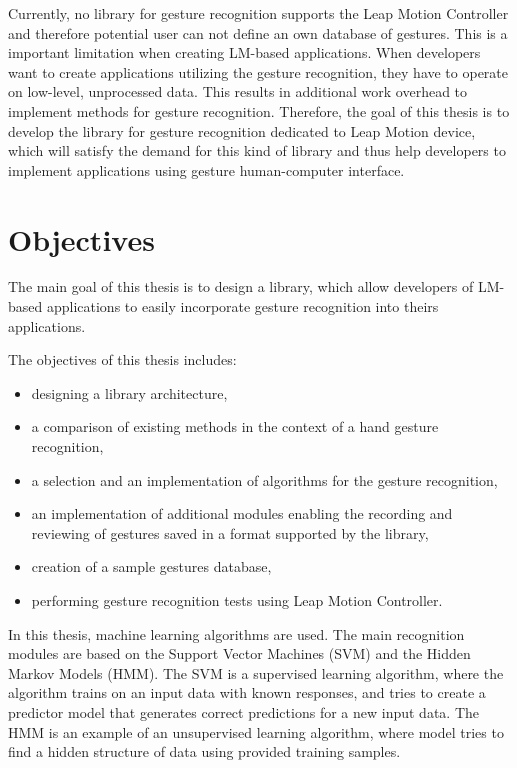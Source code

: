 Currently, no library for gesture recognition supports the Leap Motion Controller and therefore potential user can not define an own database of gestures. 
This is a important limitation when creating LM-based applications.
When developers want to create applications utilizing the gesture recognition, they have to operate on low-level, unprocessed data.
This results in additional work overhead to implement methods for gesture recognition.
Therefore, the goal of this thesis is to develop the library for gesture recognition dedicated to Leap Motion device, which will satisfy the demand for this kind of library and thus help developers to implement applications using gesture human-computer interface.


\section{Objectives}

The main goal of this thesis is to design a library, which allow developers of LM-based applications to easily incorporate gesture recognition into theirs applications.

The objectives of this thesis includes:
\begin{itemize}
\item designing a library architecture, 
\item a comparison of existing methods in the context of a hand gesture recognition,
\item a selection and an implementation of algorithms for the gesture recognition,
\item an implementation of additional modules enabling the recording and reviewing of gestures saved in a format supported by the library,
\item creation of a sample gestures database,
\item performing gesture recognition tests using Leap Motion Controller.
\end{itemize}

In this thesis, machine learning algorithms are used. 
The main recognition modules are based on the Support Vector Machines (SVM) and the Hidden Markov Models (HMM). 
The SVM is a supervised learning algorithm, where the algorithm trains on an input data with known responses, and tries to create a predictor model that generates correct predictions for a new input data.
The HMM is an example of an unsupervised learning algorithm, where model tries to find a hidden structure of data using provided training samples. 

